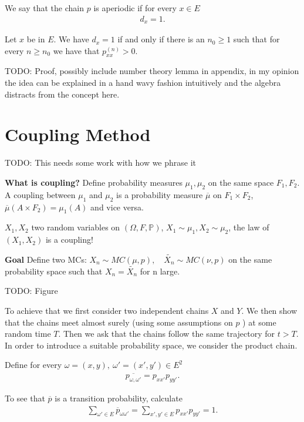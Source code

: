 \begin{defn}
	We say that the chain $p$ is aperiodic if for every $x \in E$
	\begin{align}
	\boxed{d_x=1}.
	\end{align}
\end{defn}

\begin{prop}[]
	Let $x$ be in $E$. We have $d_x=1$ if and only if there is an $n_0 \geq 1$ such that for every $n \geq n_0$ we have that $ p_{xx}^{(n)}>0$.
\end{prop}
TODO: Proof, possibly include number theory lemma in appendix, in my opinion the idea can be explained in a hand wavy fashion intuitively and the algebra distracts from the concept here.

\section{Coupling Method}
TODO: This needs some work with how we phrase it

\textbf{What is coupling?}
Define probability measures $\mu_1, \mu_2$ on the same space $F_1,F_2$. A coupling between $\mu_1$ and $\mu_2$ is a probability measure $\overline{\mu }$ on $F_1 \times F_2$, 
$\overline{\mu }(A \times F_2)=\mu_1(A)$ and vice versa. 

$X_1, X_2$ two random variables on $(\Omega, F, \mathbb{P}) $, $X_1 \sim \mu_1, X_2 \sim \mu_2$, the law of $(X_1,X_2)$ is a coupling!

\noindent
\textbf{Goal} Define two MCs: $X_n \sim MC(\mu, p), \quad \tilde{X_n} \sim MC(\nu, p) $ on the same probability space such that $X_n = \tilde{X_n}$ for n large.

TODO: Figure

To achieve that we first consider two independent chains $X$ and $Y$. We then show that the chains meet almost surely (using some assumptions on $p$ ) at some random time $T$. Then we ask that the chains follow the same trajectory for $t>T$. In order to introduce a suitable probability space, we consider the product chain.

\begin{defn}
	Define for every $\omega=(x,y), \ \omega'=(x',y') \in E^2$ 
	\begin{align}
	\boxed{\overline{p_{\omega, \omega'}}=p_{xx'}p_{yy'} }.
	\end{align}
\end{defn}
\begin{rmk}[]
	To see that $\overline{p}$ is a transition probability, calculate
	\begin{align}
		\sum_{\omega'\in E}^{} \overline{p}_{\omega \omega'} = \sum_{x',y' \in E}^{} p_{xx'}p_{yy'} = 1. 
	\end{align}
\end{rmk}


